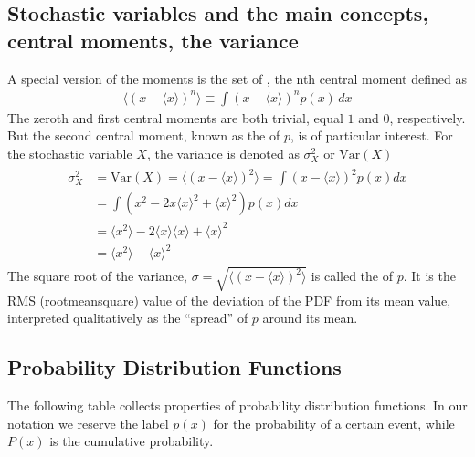 \documentclass[letterpaper,10pt,english]{sphinxmanual}
\begin{document}
\subsection{Stochastic variables and the main concepts, central moments, the variance}
\label{\detokenize{chapter3:stochastic-variables-and-the-main-concepts-central-moments-the-variance}}
A special version of the moments is the set of , the n\sphinxhyphen{}th central moment defined as
\begin{equation*}
\begin{split}
\langle (x-\langle x\rangle )^n\rangle  \equiv \int\! (x-\langle x\rangle)^n p(x)\,dx
\end{split}
\end{equation*}
The zero\sphinxhyphen{}th and first central moments are both trivial, equal \(1\) and
\(0\), respectively. But the second central moment, known as the
 of \(p\), is of particular interest. For the stochastic
variable \(X\), the variance is denoted as \(\sigma^2_X\) or \(\mathrm{Var}(X)\)
\begin{equation*}
\begin{split}
\begin{align*}
\sigma^2_X &=\mathrm{Var}(X) =  \langle (x-\langle x\rangle)^2\rangle  =
\int (x-\langle x\rangle)^2 p(x)dx\\
& =  \int\left(x^2 - 2 x \langle x\rangle^{2} +\langle x\rangle^2\right)p(x)dx\\
& =  \langle x^2\rangle - 2 \langle x\rangle\langle x\rangle + \langle x\rangle^2\\
& =  \langle x^2 \rangle - \langle x\rangle^2
\end{align*}
\end{split}
\end{equation*}
The square root of the variance, \(\sigma =\sqrt{\langle (x-\langle x\rangle)^2\rangle}\) is called the
 of \(p\). It is the RMS (root\sphinxhyphen{}mean\sphinxhyphen{}square)
value of the deviation of the PDF from its mean value, interpreted
qualitatively as the “spread” of \(p\) around its mean.


\subsection{Probability Distribution Functions}
\label{\detokenize{chapter3:probability-distribution-functions}}
The following table collects properties of probability distribution functions.
In our notation we reserve the label \(p(x)\) for the probability of a certain event,
while \(P(x)\) is the cumulative probability.
\end{document}
